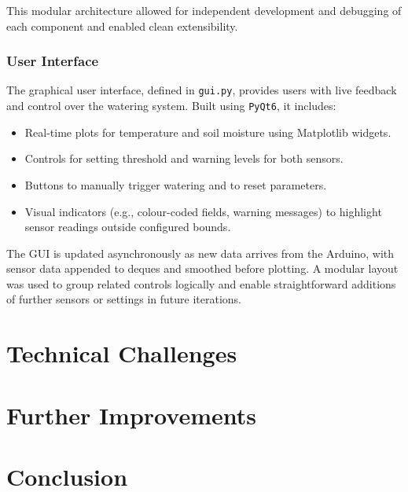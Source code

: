 \documentclass[a4paper,11pt]{article}
\begin{document}
This modular architecture allowed for independent development and 
debugging of each component and enabled clean extensibility.

\subsubsection{User Interface}
\label{subsec:software_ui}

The graphical user interface, defined in \texttt{gui.py}, 
provides users with live feedback and control over the watering system. 
Built using \texttt{PyQt6}, it includes:

\begin{itemize}
    \item Real-time plots for temperature and soil moisture using Matplotlib widgets.
    \item Controls for setting threshold and warning levels for both sensors.
    \item Buttons to manually trigger watering and to reset parameters.
    \item Visual indicators (e.g., colour-coded fields, warning messages) 
    to highlight sensor readings outside configured bounds.
\end{itemize}

The GUI is updated asynchronously as new data arrives from the Arduino, 
with sensor data appended to deques and smoothed before plotting. 
A modular layout was used to group related controls logically and 
enable straightforward additions of further sensors or settings in future iterations.

\section{Technical Challenges}
\label{sec:technical_problems}

\section{Further Improvements}
\label{sec:further_improvements}

\section{Conclusion}
\label{sec:conclusion}
\end{document}
